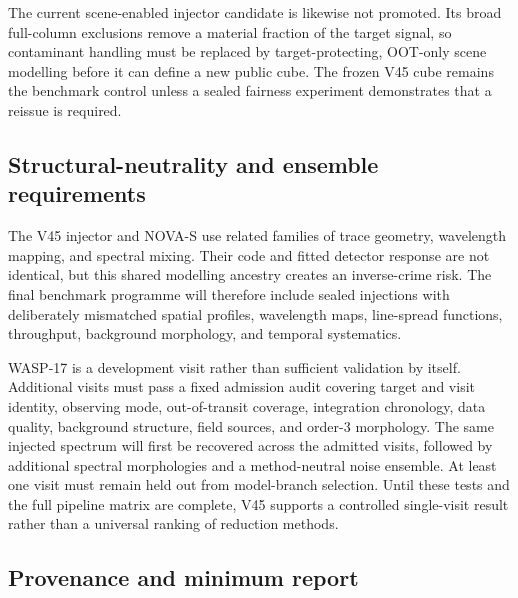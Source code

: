 The current scene-enabled injector candidate is likewise not promoted. Its
broad full-column exclusions remove a material fraction of the target signal,
so contaminant handling must be replaced by target-protecting, OOT-only scene
modelling before it can define a new public cube. The frozen V45 cube remains
the benchmark control unless a sealed fairness experiment demonstrates that a
reissue is required.

\subsection{Structural-neutrality and ensemble requirements}

The V45 injector and NOVA-S use related families of trace geometry, wavelength
mapping, and spectral mixing. Their code and fitted detector response are not
identical, but this shared modelling ancestry creates an inverse-crime risk.
The final benchmark programme will therefore include sealed injections with
deliberately mismatched spatial profiles, wavelength maps, line-spread
functions, throughput, background morphology, and temporal systematics.

WASP-17 is a development visit rather than sufficient validation by itself.
Additional visits must pass a fixed admission audit covering target and visit
identity, observing mode, out-of-transit coverage, integration chronology,
data quality, background structure, field sources, and order-3 morphology.
The same injected spectrum will first be recovered across the admitted visits,
followed by additional spectral morphologies and a method-neutral noise
ensemble. At least one visit must remain held out from model-branch selection.
Until these tests and the full pipeline matrix are complete, V45 supports a
controlled single-visit result rather than a universal ranking of reduction
methods.

\subsection{Provenance and minimum report}


